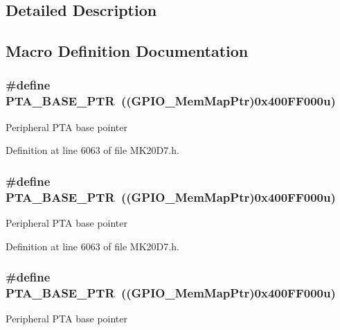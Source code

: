 \subsection{Detailed Description}


\subsection{Macro Definition Documentation}
\subsubsection[{\texorpdfstring{P\+T\+A\+\_\+\+B\+A\+S\+E\+\_\+\+P\+TR}{PTA_BASE_PTR}}]{\setlength{\rightskip}{0pt plus 5cm}\#define P\+T\+A\+\_\+\+B\+A\+S\+E\+\_\+\+P\+TR~(({\bf G\+P\+I\+O\+\_\+\+Mem\+Map\+Ptr})0x400\+F\+F000u)}\hypertarget{group___g_p_i_o___peripheral_gadf98f6ee2bbfd42102e378a66b29b9ef}{}\label{group___g_p_i_o___peripheral_gadf98f6ee2bbfd42102e378a66b29b9ef}
Peripheral P\+TA base pointer 

Definition at line 6063 of file M\+K20\+D7.\+h.

\subsubsection[{\texorpdfstring{P\+T\+A\+\_\+\+B\+A\+S\+E\+\_\+\+P\+TR}{PTA_BASE_PTR}}]{\setlength{\rightskip}{0pt plus 5cm}\#define P\+T\+A\+\_\+\+B\+A\+S\+E\+\_\+\+P\+TR~(({\bf G\+P\+I\+O\+\_\+\+Mem\+Map\+Ptr})0x400\+F\+F000u)}\hypertarget{group___g_p_i_o___peripheral_gadf98f6ee2bbfd42102e378a66b29b9ef}{}\label{group___g_p_i_o___peripheral_gadf98f6ee2bbfd42102e378a66b29b9ef}
Peripheral P\+TA base pointer 

Definition at line 6063 of file M\+K20\+D7.\+h.

\subsubsection[{\texorpdfstring{P\+T\+A\+\_\+\+B\+A\+S\+E\+\_\+\+P\+TR}{PTA_BASE_PTR}}]{\setlength{\rightskip}{0pt plus 5cm}\#define P\+T\+A\+\_\+\+B\+A\+S\+E\+\_\+\+P\+TR~(({\bf G\+P\+I\+O\+\_\+\+Mem\+Map\+Ptr})0x400\+F\+F000u)}\hypertarget{group___g_p_i_o___peripheral_gadf98f6ee2bbfd42102e378a66b29b9ef}{}\label{group___g_p_i_o___peripheral_gadf98f6ee2bbfd42102e378a66b29b9ef}
Peripheral P\+TA base pointer 

